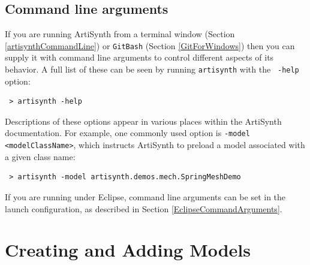 \subsection{Command line arguments}
\label{CommandLineArguments}

If you are running ArtiSynth from a terminal window
(Section \ref{artisynthCommandLine})
\ifWindows
or {\tt GitBash} (Section \ref{GitForWindows})
\fi
then you can supply it with
command line arguments to control different aspects of its behavior.
A full list of these can be seen by running {\tt artisynth} with the {\tt
-help} option:
\begin{verbatim}
 > artisynth -help
\end{verbatim}
Descriptions of these options appear in various places within the
ArtiSynth documentation. For example, one commonly used option is
{\tt -model <modelClassName>}, which instructs ArtiSynth to preload a
model associated with a given class name:
\begin{verbatim}
 > artisynth -model artisynth.demos.mech.SpringMeshDemo
\end{verbatim}

If you are running under Eclipse, command line arguments can be set in
the launch configuration, as described in
Section \ref{EclipseCommandArguments}.

\section{Creating and Adding Models}
\label{AddingModels}


